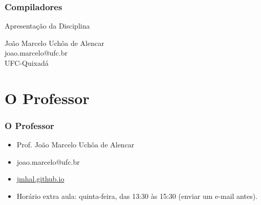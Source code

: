 \documentclass[table]{beamer}
\begin{document}
\begin{frame}
   \frametitle{Compiladores}
   \large
   \begin{center}
      Apresentação da Disciplina 
   \end{center}
   \scriptsize
   \begin{center}
      João Marcelo Uchôa de Alencar \\
      joao.marcelo@ufc.br \\
      UFC-Quixadá
   \end{center}
\end{frame}

\begin{frame}
   \tableofcontents
\end{frame}

\section{O Professor}
\begin{frame}
   \frametitle{O Professor}
   \begin{itemize}
      \item Prof. João Marcelo Uchôa de Alencar
      \item joao.marcelo@ufc.br
      \item \url{jmhal.github.io}
      \item Horário extra aula: quinta-feira, das 13:30 às 15:30 (enviar um e-mail antes).
   \end{itemize}
\end{frame}
\end{document}
